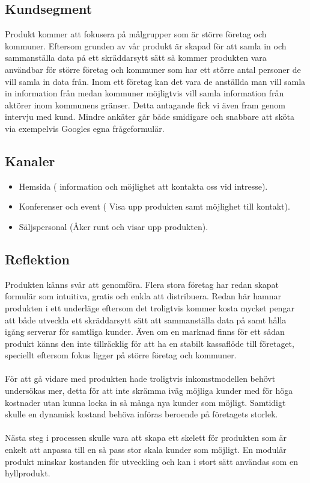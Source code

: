 \documentclass[12pt]{article}
\begin{document}
\subsection{Kundsegment}
Produkt kommer att fokusera på målgrupper som är större företag och kommuner. Eftersom grunden av vår produkt är skapad för att samla in och sammanställa data på ett skräddarsytt sätt så kommer produkten vara användbar för större företag och kommuner som har ett större antal personer de vill samla in data från. Inom ett företag kan det vara de anställda man vill samla in information från medan kommuner möjligtvis vill samla information från aktörer inom kommunens gränser. Detta antagande fick vi även fram genom intervju med kund. Mindre ankäter går både smidigare och snabbare att sköta via exempelvis Googles egna frågeformulär. 

\subsection{Kanaler}
\begin{itemize}
    \item Hemsida ( information och möjlighet att kontakta oss vid intresse).
    \item Konferenser och event ( Visa upp produkten samt möjlighet till kontakt).
    \item Säljspersonal (Åker runt och visar upp produkten).
\end{itemize}


\subsection{Reflektion}
Produkten känns svår att genomföra. Flera stora företag har redan skapat formulär som intuitiva, gratis och enkla att distribuera. Redan här hamnar produkten i ett underläge eftersom det troligtvis kommer kosta mycket pengar att både utveckla ett skräddarsytt sätt att sammanställa data på samt hålla igång serverar för samtliga kunder. Även om en marknad finns för ett sådan produkt känns den inte tillräcklig för att ha en stabilt kassaflöde till företaget, speciellt eftersom fokus ligger på större företag och kommuner. \\\\
För att gå vidare med produkten hade troligtvis inkomstmodellen behövt undersökas mer, detta för att inte skrämma iväg möjliga kunder med för höga kostnader utan kunna locka in så många nya kunder som möjligt. Samtidigt skulle en dynamisk kostand behöva införas beroende på företagets storlek. \\\\
Nästa steg i processen skulle vara att skapa ett skelett för produkten som är enkelt att anpassa till en så pass stor skala kunder som möjligt. En modulär produkt minskar kostanden för utveckling och kan i stort sätt användas som en hyllprodukt.


\end{document}
